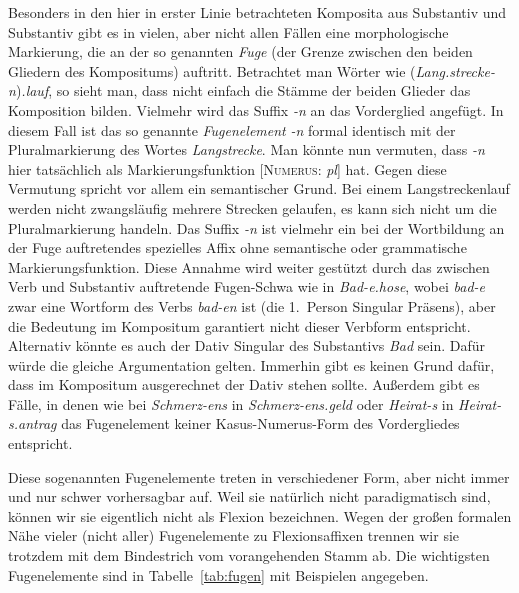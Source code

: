 Besonders in den hier in erster Linie betrachteten Komposita aus Substantiv und Substantiv gibt es in vielen, aber nicht allen Fällen eine morphologische Markierung, die an der so genannten \textit{Fuge} (der Grenze zwischen den beiden Gliedern des Kompositums) auftritt.
Betrachtet man Wörter wie (\textit{Lang.strecke-n})\textit{.lauf}, so sieht man, dass nicht einfach die Stämme der beiden Glieder das Komposition bilden.
Vielmehr wird das Suffix \textit{-n} an das Vorderglied angefügt.
In diesem Fall ist das so genannte \textit{Fugenelement} \textit{-n} formal identisch mit der Pluralmarkierung des Wortes \textit{Langstrecke}.
Man könnte nun vermuten, dass \textit{-n} hier tatsächlich als Markierungsfunktion [\textsc{Numerus}: \textit{pl}] hat.
Gegen diese Vermutung spricht vor allem ein semantischer Grund.
Bei einem Langstreckenlauf werden nicht zwangsläufig mehrere Strecken gelaufen, es kann sich nicht um die Pluralmarkierung handeln.
Das Suffix \textit{-n} ist vielmehr ein bei der Wortbildung an der Fuge auftretendes spezielles Affix ohne semantische oder grammatische Markierungsfunktion.
Diese Annahme wird weiter gestützt durch das zwischen Verb und Substantiv auftretende Fugen-Schwa wie in \textit{Bad-e.hose}, wobei \textit{bad-e} zwar eine Wortform des Verbs \textit{bad-en} ist (\zB die 1.~Person Singular Präsens), aber die Bedeutung im Kompositum garantiert nicht dieser Verbform entspricht.
Alternativ könnte es auch der Dativ Singular des Substantivs \textit{Bad} sein.
Dafür würde die gleiche Argumentation gelten.
Immerhin gibt es keinen Grund dafür, dass im Kompositum ausgerechnet der Dativ stehen sollte.
Außerdem gibt es Fälle, in denen wie bei \textit{\Ast Schmerz-ens} in \textit{Schmerz-ens.geld} oder \textit{\Ast Heirat-s} in \textit{Heirat-s.antrag} das Fugenelement keiner Kasus-Numerus-Form des Vordergliedes entspricht.

Diese sogenannten Fugenelemente treten in verschiedener Form, aber nicht immer und nur schwer vorhersagbar auf.
Weil sie natürlich nicht paradigmatisch sind, können wir sie eigentlich nicht als Flexion bezeichnen.
Wegen der großen formalen Nähe vieler (nicht aller) Fugenelemente zu Flexionsaffixen trennen wir sie trotzdem mit dem Bindestrich vom vorangehenden Stamm ab.
Die wichtigsten Fugenelemente sind in Tabelle~\ref{tab:fugen} mit Beispielen angegeben.

